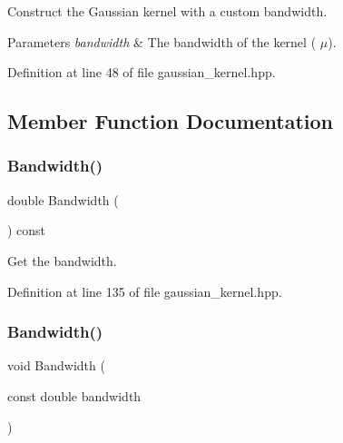 Construct the Gaussian kernel with a custom bandwidth. 


\begin{DoxyParams}{Parameters}
{\em bandwidth} & The bandwidth of the kernel ( $\mu$). \\
\hline
\end{DoxyParams}


Definition at line 48 of file gaussian\+\_\+kernel.\+hpp.



\subsection{Member Function Documentation}
\mbox{\label{classmlpack_1_1kernel_1_1GaussianKernel_ae9cbd816179d6c36036139ccc8fea8c8}} 
\subsubsection{Bandwidth()\hspace{0.1cm}{\footnotesize\ttfamily [1/2]}}
{\footnotesize\ttfamily double Bandwidth (\begin{DoxyParamCaption}{ }\end{DoxyParamCaption}) const\hspace{0.3cm}{\ttfamily [inline]}}



Get the bandwidth. 



Definition at line 135 of file gaussian\+\_\+kernel.\+hpp.

\mbox{\label{classmlpack_1_1kernel_1_1GaussianKernel_a73bfbbc3f9a234670309c4895a7321e1}} 
\subsubsection{Bandwidth()\hspace{0.1cm}{\footnotesize\ttfamily [2/2]}}
{\footnotesize\ttfamily void Bandwidth (\begin{DoxyParamCaption}\item[{const double}]{bandwidth }\end{DoxyParamCaption})\hspace{0.3cm}{\ttfamily [inline]}}




